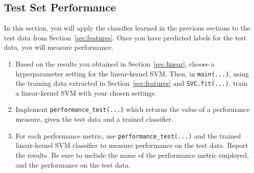 \documentclass[11pt]{article}
\begin{document}
\subsection{Test Set Performance }\label{sec:test}
In this section, you will apply the  classifier learned in the previous sections to the test data from Section~\ref{sec:features}. Once you have predicted labels for the test data, you will measure performance. 
\begin{enumerate}
\item {} Based on the results you obtained in Section~\ref{sec:linear}, choose a hyperparameter setting for the linear-kernel SVM. %
Then, in \verb|main(...)|, using the training data extracted in Section~\ref{sec:features} and \verb|SVC.fit(...)|, train a linear-kernel SVM with your chosen settings.

\item {} Implement \verb|performance_test(...)| which returns the value of a performance measure, given the test data and a trained classifier.

\item {} For each performance metric, use \verb|performance_test(...)| and the trained linear-kernel SVM classifier to measure performance on the test data. Report the results. Be sure to include the name of the performance metric employed, and the performance on the test data.



\end{enumerate}






\end{document}
